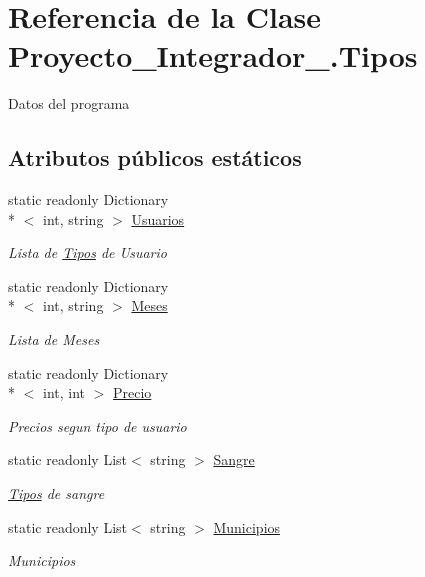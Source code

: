 \hypertarget{class_proyecto___integrador__3_1_1_tipos}{\section{Referencia de la Clase Proyecto\-\_\-\-Integrador\-\_.\-Tipos}
\label{class_proyecto___integrador__3_1_1_tipos}
}


Datos del programa  


\subsection*{Atributos públicos estáticos}
\begin{DoxyCompactItemize}
\item 
static readonly Dictionary\\*
$<$ int, string $>$ \hyperlink{class_proyecto___integrador__3_1_1_tipos_ae053b8caca38c487e2d9d2635b154c88}{Usuarios}
\begin{DoxyCompactList}\small\item\em Lista de \hyperlink{class_proyecto___integrador__3_1_1_tipos}{Tipos} de Usuario \end{DoxyCompactList}\item 
static readonly Dictionary\\*
$<$ int, string $>$ \hyperlink{class_proyecto___integrador__3_1_1_tipos_a5c5105231581a49b0914b197f4aed005}{Meses}
\begin{DoxyCompactList}\small\item\em Lista de Meses \end{DoxyCompactList}\item 
static readonly Dictionary\\*
$<$ int, int $>$ \hyperlink{class_proyecto___integrador__3_1_1_tipos_afe593c0c3c57dd7bf5133d57974f1ed3}{Precio}
\begin{DoxyCompactList}\small\item\em Precios segun tipo de usuario \end{DoxyCompactList}\item 
static readonly List$<$ string $>$ \hyperlink{class_proyecto___integrador__3_1_1_tipos_a25b8a490a180214246eedb322ed962a2}{Sangre}
\begin{DoxyCompactList}\small\item\em \hyperlink{class_proyecto___integrador__3_1_1_tipos}{Tipos} de sangre \end{DoxyCompactList}\item 
static readonly List$<$ string $>$ \hyperlink{class_proyecto___integrador__3_1_1_tipos_a950165b224eba3af8ee67d0b344f0704}{Municipios}
\begin{DoxyCompactList}\small\item\em Municipios \end{DoxyCompactList}\end{DoxyCompactItemize}
